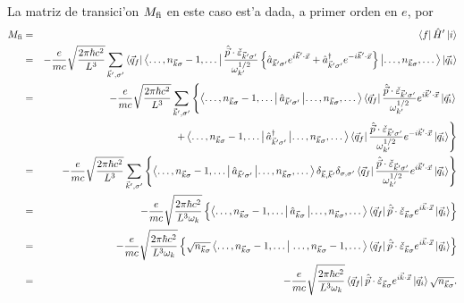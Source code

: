 La matriz de transici'on $M_{\rm fi}$ en este caso est'a dada, a primer orden en
$e$, por
\begin{eqnarray}
M_{\rm fi} & = &\left\langle f\right| \hat{H}'\left|
i\right\rangle  \\
& = &-\frac{e}{mc}\sqrt{\frac{2\pi\hbar c^2}{L^3}}\sum_{\vec{k}',\sigma
'}\left\langle \vec{q}_f\right| \left\langle \dots,n_{\vec{k}\sigma
}-1,\dots\right|
\frac{\hat{\vec{p}}\cdot\check{\varepsilon}_{\vec{k}'\sigma
'}}{\omega_{k'}^{1/2}}\left\{ \hat{a}_{\vec{k}'\sigma '}e^{i\vec{k}
'\cdot\vec{x}}+\hat{a}_{\vec{k}'\sigma
'}^\dagger e^{-i\vec{k}'\cdot\vec{x}}\right\} \left|
\dots,n_{\vec{k}\sigma},\dots\right\rangle 
\left| \vec{q}_i\right\rangle  \nonumber \\
& = &-\frac{e}{mc}\sqrt{\frac{2\pi\hbar c^2}{L^3}}\sum_{\vec{k}',\sigma
'}\left\{
\left\langle \dots,n_{\vec{k}\sigma}-1,\dots\right|
\hat{a}_{\vec{k}'\sigma'}\left| \dots,n_{\vec{k}\sigma},\dots\right\rangle 
\left\langle \vec{q}_f\right|
\frac{\hat{\vec{p}}\cdot\check{\varepsilon}%
_{\vec{k}'\sigma '}}{\omega_{k'}^{1/2}}e^{i\vec{k}'\cdot\vec{x}}\left|
\vec{q}_i\right\rangle  \right. \nonumber \\
&& \qquad \left.+\left\langle \dots,n_{\vec{k}\sigma}-1,\dots\right|
\hat{a}_{\vec{k}'\sigma '}^\dagger \left|
\dots,n_{\vec{k}\sigma},\dots\right\rangle 
\left\langle
\vec{q}_f\right|
\frac{\hat{\vec{p}}\cdot\check{\varepsilon}_{\vec{k}'\sigma
'}}{\omega_{k'}^{1/2}}e^{-i\vec{k}'\cdot\vec{x}}\left| \vec{q}_i\right\rangle 
\right\} \\
& = &-\frac{e}{mc}\sqrt{\frac{2\pi\hbar c^2}{L^3}}\sum_{\vec{k}',\sigma
'}\left\{\left\langle \dots,n_{\vec{k}\sigma}-1,\dots\right|
\hat{a}_{\vec{k}'\sigma '}\left|
\dots,n_{\vec{k}\sigma},\dots\right\rangle \delta_{\vec{k},\vec{k}'}\delta_{
\sigma,\sigma '}
\left\langle \vec{q}%
_f\right|\frac{\hat{\vec{p}}\cdot\check{\varepsilon}_{\vec{k}
'\sigma'}}{\omega_{k'}^{1/2}}e^{i\vec{k}'\cdot\vec{x}}\left|
\vec{q}_i\right\rangle \right\}\\
& = &-\frac{e}{mc}\sqrt{\frac{2\pi\hbar
c^2}{L^3\omega_k}}\left\{\left\langle
\dots,n_{\vec{k}\sigma}-1,\dots\right| \hat{a}_{\vec{k}\sigma}\left|
\dots,n_{\vec{k}\sigma},\dots\right\rangle  \left\langle
\vec{q}_f\right|\hat{\vec{p}}\cdot\check{\varepsilon}_{\vec{k}
\sigma}e^{i\vec{k}\cdot\vec{x}}\left|\vec{q}_i\right\rangle  \right\}\\
& = &-\frac{e}{mc}\sqrt{\frac{2\pi\hbar
c^2}{L^3\omega_k}}\left\{\sqrt{n_{\vec{k}\sigma}}\left\langle
\dots,n_{\vec{k}\sigma}-1,\dots\right|\left.
\dots,n_{\vec{k}\sigma}-1,\dots\right\rangle  \left\langle
\vec{q}_f\right|\hat{\vec{p}}\cdot\check{\varepsilon}_{\vec{k}
\sigma}e^{i\vec{k}\cdot\vec{x}}\left|\vec{q}_i\right\rangle  \right\}\\
& = &-\frac{e}{mc}\sqrt{\frac{2\pi\hbar c^2}{L^3\omega_k}}\left\langle
\vec{q}_f\right| \hat{\vec{p}}\cdot\check{\varepsilon}%
_{\vec{k}\sigma}e^{i\vec{k}\cdot\vec{x}}\left| \vec{q}_i\right\rangle 
\sqrt{n_{\vec{k}\sigma}}.
\end{eqnarray}

